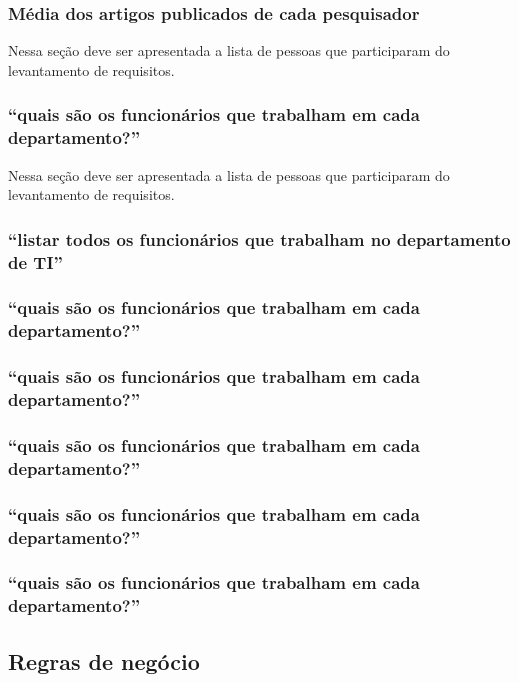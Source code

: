 \documentclass[11pt]{../../classes/ifscarticle}
\begin{document}
\subsubsection{Média dos artigos publicados de cada pesquisador}

Nessa seção deve ser apresentada a lista de pessoas que participaram do levantamento de requisitos.


\subsubsection{“quais são os funcionários que trabalham em cada departamento?”}

Nessa seção deve ser apresentada a lista de pessoas que participaram do levantamento de requisitos.


\subsubsection{“listar todos os funcionários que trabalham no departamento de TI”}


\subsubsection{“quais são os funcionários que trabalham em cada departamento?”}


\subsubsection{“quais são os funcionários que trabalham em cada departamento?”}


\subsubsection{“quais são os funcionários que trabalham em cada departamento?”}


\subsubsection{“quais são os funcionários que trabalham em cada departamento?”}


\subsubsection{“quais são os funcionários que trabalham em cada departamento?”}


\subsection{Regras de negócio}
\label{sec:regrasdenegocio}
\end{document}
